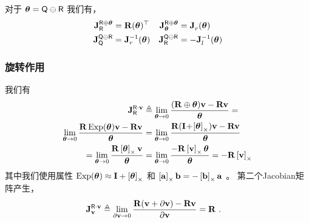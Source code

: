 对于 $\bth=\sQ\om\sR$ 我们有，
%
\begin{align}
\mjac{\sR\op\bth}{\sR}    
  &=  \bfR(\bth)\tr 
  &
\mjac{\sR\op\bth}{\bth} 
  &=  \mjac{}{r}(\bth)
  \\
\mjac{\sQ\om\sR}{\sQ} 
  &=  \mjac{-1}{r}(\bth)
  &
\mjac{\sQ\om\sR}{\sR} 
  &= -\mjac{-1}{l}(\bth) 
\end{align}
%


\subsubsection{旋转作用} 
\label{sec:jac_SO3_action}

我们有
\begin{align}
\mjac{\sR\cdot\bfv}{\sR} 
\small
&\te \lim_{\bth\to0}\frac{(\bfR\op\bth)\bfv-\bfR\bfv}{\bth} = \notag \\
\lim_{\bth\to0}\frac{\bfR\Exp(\bth)\bfv-\bfR\bfv}{\bth} 
&= \lim_{\bth\to0}\frac{\bfR(\bfI\!+\!\hatx{\bth})\bfv-\bfR\bfv}{\bth} \notag \\
= \lim_{\bth\to0}\frac{\bfR\hatx{\bth}\bfv}{\bth} 
&= \lim_{\bth\to0}\frac{-\bfR\hatx{\bfv}\bth}{\bth} 
= -\bfR\hatx{\bfv} 
\end{align}
%
其中我们使用属性 $\Exp(\bth) \approx \bfI + \hatx{\bth}$ 和  $\hatx{\bfa}\bfb = -\hatx{\bfb}\bfa$ 。
第二个Jacobian矩阵产生，
%
\begin{align}
\mjac{\sR\cdot\bfv}{\bfv}
&\te \lim_{\partial\bfv\to0}\frac{\bfR(\bfv+\partial\bfv)-\bfR\bfv}{\partial\bfv} 
= \bfR
~.
\end{align}




